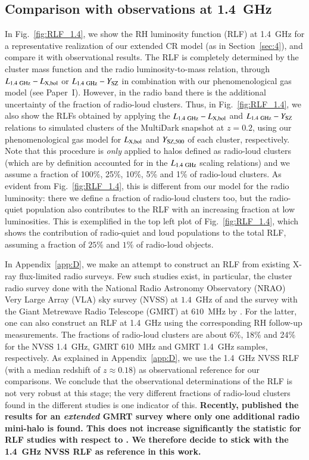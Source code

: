 \documentclass[useAMS,usenatbib]{mn2e}
\begin{document}
\subsection{Comparison with observations at 1.4~GHz}

In Fig.~\ref{fig:RLF_1.4}, we show the RH luminosity function (RLF) at 1.4~GHz
for a representative realization of our extended CR model (as in
Section~\ref{sec:4}), and compare it with observational results. 
The RLF is completely determined by the cluster mass function and the radio
luminosity-to-mass relation, through $L_{1.4~{\mathrm{GHz}}}-L_{ {\mathrm{X,bol}}}$ or
$L_{1.4~{\mathrm{GHz}}}-Y_{{\mathrm{SZ}}}$ in combination with our phenomenological gas
model (see Paper~I). However, in the radio band there is the additional uncertainty of the
fraction of radio-loud clusters. Thus, in Fig.~\ref{fig:RLF_1.4}, we also show
the RLFs obtained by applying the $L_{1.4~{\mathrm{GHz}}}-L_{{\mathrm{X,bol}}}$ and
$L_{1.4~{\mathrm{GHz}}}-Y_{{\mathrm{SZ}}}$ relations to simulated clusters of the
MultiDark snapshot at $z = 0.2$, using our phenomenological gas model for
$L_{{\mathrm{X,bol}}}$ and $Y_{{\mathrm{SZ}}, 500}$ of each cluster, respectively. Note
that this procedure is {\em only} applied to halos defined as radio-loud
clusters (which are by definition accounted for in the $L_{1.4~{\mathrm{GHz}}}$
scaling relations) and we assume a fraction of 100\%, 25\%, 10\%, 5\% and 1\% of
radio-loud clusters. As evident from Fig.~\ref{fig:RLF_1.4}, this is different
from our model for the radio luminosity: there we define a fraction of
radio-loud clusters too, but the radio-quiet population also contributes to the
RLF with an increasing fraction at low luminosities. This is exemplified in the
top left plot of Fig.~\ref{fig:RLF_1.4}, which shows the contribution of
radio-quiet and loud populations to the total RLF, assuming a fraction of $25\%$
and $1\%$ of radio-loud objects.

In Appendix~\ref{app:D}, we make an attempt to construct an RLF from existing
X-ray flux-limited radio surveys. Few such studies exist, in particular, the cluster
radio survey done with the National Radio Astronomy Observatory (NRAO) Very
Large Array (VLA) sky survey (NVSS) at $1.4$~GHz of \cite{1999NewA....4..141G}
and the survey with the Giant Metrewave Radio Telescope (GMRT) at $610$~MHz by
\cite{VenturiGMRT_1,VenturiGMRT_2}. For the latter, one can also construct an RLF
at 1.4~GHz using the corresponding RH follow-up measurements. The fractions of
radio-loud clusters are about 6\%, 18\% and 24\% for the NVSS 1.4~GHz, GMRT
610~MHz and GMRT 1.4~GHz samples, respectively. As explained in
Appendix~\ref{app:D}, we use the 1.4~GHz NVSS RLF (with a median redshift of $z
\approx 0.18$) as observational reference for our comparisons. We conclude that
the observational determinations of the RLF is not very robust at this stage;
the very different fractions of radio-loud clusters found in the different
studies is one indicator of this. {\bf Recently, \cite{2013arXiv1306.3102K} published
the results for an \emph{extended} GMRT survey where only one additional radio 
mini-halo is found. This does not increase significantly the statistic for RLF 
studies with respect to \cite{VenturiGMRT_1,VenturiGMRT_2}. We therefore decide to 
stick with the 1.4~GHz NVSS RLF as reference in this work.}  
  
\end{document}
